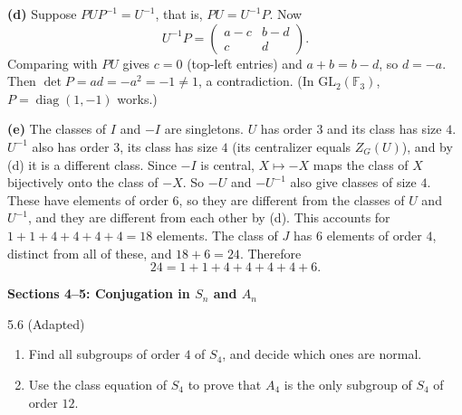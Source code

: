 \documentclass[11pt]{article}
\newcommand{\F}{\mathbb{F}}
\newcommand{\GL}{\mathrm{GL}}
\newcommand{\sectionheading}[1]{%
  \Needspace{8\baselineskip}
  \vspace{0.25em}
  {\color{darkgray}\large\bfseries #1}\par
}
\begin{document}
\begin{solution}
\textbf{(d)} Suppose $PUP^{-1}=U^{-1}$, that is, $PU=U^{-1}P$. Now
\[
  U^{-1}P=\begin{pmatrix}a-c&b-d\\c&d\end{pmatrix}.
\]
 Comparing with $PU$ gives $c=0$ (top-left entries) and $a+b=b-d$, so $d=-a$. Then
$\det P=ad=-a^2=-1\neq1$, a contradiction. (In $\GL_2(\F_3)$,
$P=\operatorname{diag}(1,-1)$ works.)

\textbf{(e)} The classes of $I$ and $-I$ are singletons. $U$ has order $3$
 and its class has size $4$. $U^{-1}$ also has order $3$, its class has size $4$ (its centralizer equals
 $Z_G(U)$), and by (d) it is a different class. Since $-I$ is central, $X\mapsto -X$ maps the class
 of $X$ bijectively onto the class of $-X$. So $-U$ and $-U^{-1}$ also give classes of size $4$.
 These have elements of order $6$, so they are different from the classes of $U$ and $U^{-1}$, and they are different from each other
 by (d). This accounts for $1+1+4+4+4+4=18$ elements. The class of
$J$ has $6$ elements of order $4$, distinct from all of these, and
$18+6=24$. Therefore
\[
  24=1+1+4+4+4+4+6.
\]
\end{solution}

\sectionheading{Sections 4--5: Conjugation in $S_n$ and $A_n$}

\begin{exercise}{5.6 (Adapted)}
\begin{enumerate}[label=\textbf{(\alph*)}]
  \item Find all subgroups of order $4$ of $S_4$, and decide which ones
        are normal.
  \item Use the class equation of $S_4$ to prove that $A_4$ is the only
        subgroup of $S_4$ of order $12$.
\end{enumerate}
\end{exercise}
\end{document}
